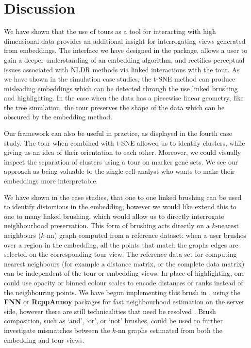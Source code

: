 \documentclass[article,notitle]{jdssv}
\begin{document}
\hypertarget{discussion}{%
\section{Discussion}\label{discussion}}

We have shown that the use of tours as a tool for interacting with
high dimensional data provides an additional insight for interrogating views
generated from embeddings. The interface we have designed in the 
package, allows a user to gain a deeper understanding of an embedding
algorithm, and rectifies perceptual issues associated with NLDR methods via
linked interactions with the tour. As we have shown in the simulation case
studies, the t-SNE method can produce misleading embeddings which can be
detected through the use linked brushing and highlighting. In the case when
the data has a piecewise linear geometry, like the tree simulation, the tour
preserves the shape of the data which can be obscured by the embedding method.

Our framework can also be useful in practice, as displayed
in the fourth case study. The tour when combined with t-SNE allowed us
to identify clusters, while giving us an idea of their orientation to
each other. Moreover, we could visually inspect the separation of clusters
using a tour on marker gene sets. We see our approach as being valuable
to the single cell analyst who wants to make their embeddings more
interpretable.

We have shown in the case studies, that one to one linked brushing can
be used to identify distortions in the embedding, however we would
like extend this to one to many linked brushing, which would allow us to directly interrogate neighbourhood preservation. This form of brushing acts directly on a \(k\)-nearest neighbours (\(k\)-nn) graph computed from a
reference dataset: when a user brushes over a region in the embedding,
all the points that match the graphs edges are selected on the
corresponding tour view. The reference data set for computing
nearest neighbours (for example a distance matrix, or the complete data matrix)
can be independent of the tour or embedding views. In place of
highlighting, one could use opacity or binned colour scales to encode
distances or ranks instead of the neighbouring points. We have begun
implementing this brush in , using the \textbf{FNN} or \textbf{RcppAnnoy}
packages for fast neighbourhood estimation on the server side, however there
are still technicalities that need be resolved \citep{fnn-pkg, rcpp-annoy-pkg}.
Brush composition, such as `and', `or', or `not' brushes, could be used to
further investigate mismatches between the \(k\)-nn graphs estimated from both the embedding and tour views.
\end{document}
